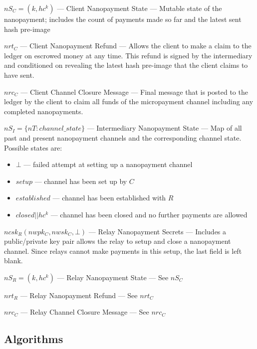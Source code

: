 $nS_C = (k, hc^k)$ --- Client Nanopayment State --- Mutable state of the
nanopayment; includes the count of payments made so far and the latest sent hash
pre-image

$nrt_C$ --- Client Nanopayment Refund --- Allows the client to make a claim
to the ledger on escrowed money at any time. This refund is signed by the
intermediary and conditioned on revealing the latest hash pre-image that the
client claims to have sent.

$nrc_C$ --- Client Channel Closure Message --- Final message that is
posted to the ledger by the client to claim all funds of the
micropayment channel including any completed nanopayments.

$nS_I = \{nT: channel\_state\}$ --- Intermediary Nanopayment State --- Map of
all past and present nanopayment channels and the corresponding channel
state. Possible states are:


\begin{itemize}
\item $\bot$ --- failed attempt at setting up a nanopayment channel
\item $setup$ --- channel has been set up by $C$
\item $established$ --- channel has been established with $R$
\item $closed||hc^k$ --- channel has been closed and no further payments
  are allowed
\end{itemize}

$ncsk_R (nwpk_C, nwsk_C, \bot)$ --- Relay Nanopayment Secrets --- Includes a
public/private key pair allows the relay to setup and close a nanopayment
channel. Since relays cannot make payments in this setup, the last field is left
blank.

$nS_R = (k, hc^k)$ --- Relay Nanopayment State --- See $nS_C$

$nrt_R$ --- Relay Nanopayment Refund --- See $nrt_C$

$nrc_C$ --- Relay Channel Closure Message --- See $nrc_C$

\subsection{Algorithms}

